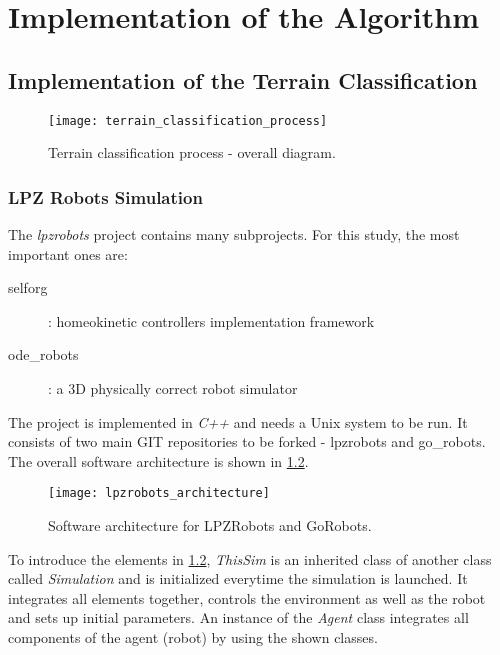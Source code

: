 \chapter{Implementation of the Algorithm} \label{app:implementation_details}

\section{Implementation of the Terrain Classification}

\begin{figure}[H]
  \centering
  \texttt{[image: terrain\_classification\_process]}
  \caption{Terrain classification process - overall diagram.}
  \label{img:app:terrain_classification_process}
\end{figure}

\subsection*{LPZ Robots Simulation} \label{ssec:app:lpzrobots_sim}
The \textit{lpzrobots} project contains many subprojects. For this study, the most important ones are:

\begin{description}
\item[selforg] : homeokinetic controllers implementation framework
\item[ode\_robots] : a 3D physically correct robot simulator
\end{description}

The project is implemented in \textit{C++} and needs a Unix system to be run. It consists of two main GIT repositories to be forked - lpzrobots and go\_robots. The overall software architecture is shown in \cref{img:lpzrobots_architecture}.

\begin{figure}[H]
  \centering
  \texttt{[image: lpzrobots\_architecture]}
  \caption{Software architecture for LPZRobots and GoRobots. \citep{misc:lpzrobots}}
  \label{img:lpzrobots_architecture}
\end{figure}

To introduce the elements in \cref{img:lpzrobots_architecture}, \textit{ThisSim} is an inherited class of another class called \textit{Simulation} and is initialized everytime the simulation is launched. It integrates all elements together, controls the environment as well as the robot and sets up initial parameters. An instance of the \textit{Agent} class integrates all components of the agent (robot) by using the shown classes.

